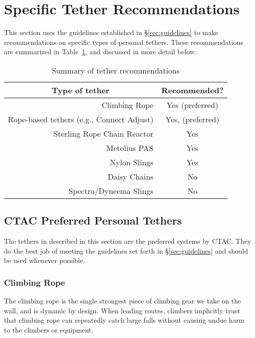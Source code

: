 \documentclass[nonacm,acmtog]{acmart}
\begin{document}
\section{Specific Tether Recommendations}
\label{sec:recommendations}

   This section uses the guidelines established in \S\ref{sec:guidelines} to
   make recommendations on specific types of personal tethers.  These
   recommendations are summarized in Table~\ref{tab:summary}, and discussed in
   more detail below.
	
	\begin{table}
	\Small
	\centering
	\begin{tabular}{|r||c|}
		\hline
		\multicolumn{1}{|c||}{\bf Type of tether} & {\bf Recommended?} \\
		\hline
		Climbing Rope & Yes (preferred) \\
		Rope-based tethers (e.g., Connect Adjust) & Yes, (preferred)  \\
		\hline
		Sterling Rope Chain Reactor & Yes \\
		Metolius PAS & Yes \\
		Nylon Slings & Yes \\
		\hline
		Daisy Chains & No \\
		Spectra/Dyneema Slings & No \\
		\hline
	\end{tabular}
	\caption{Summary of tether recommendations}
	\label{tab:summary}
\end{table}


\subsection{CTAC Preferred Personal Tethers}
\label{sec:recommended}

   The tethers in described in this section are the preferred systems by CTAC.
   They do the best job of meeting the guidelines set forth in
   \S\ref{sec:guidelines} and should be used whenever possible.

\subsubsection{Climbing Rope}

   The climbing rope is the single strongest piece of climbing gear we take on
   the wall, and is dynamic by design.  When leading routes, climbers
   implicitly trust that climbing rope can repeatedly catch large falls without
   causing undue harm to the climbers or equipment.
\end{document}
